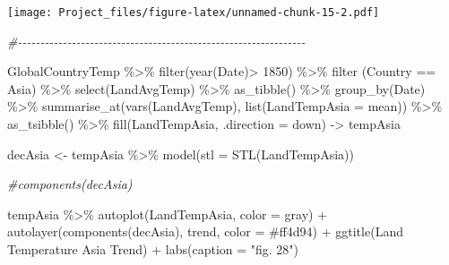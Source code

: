 \documentclass[
]{article}
\newenvironment{Shaded}{\begin{snugshade}}{\end{snugshade}}
\newcommand{\AttributeTok}[1]{\textcolor[rgb]{0.77,0.63,0.00}{#1}}
\newcommand{\CommentTok}[1]{\textcolor[rgb]{0.56,0.35,0.01}{\textit{#1}}}
\newcommand{\DecValTok}[1]{\textcolor[rgb]{0.00,0.00,0.81}{#1}}
\newcommand{\FunctionTok}[1]{\textcolor[rgb]{0.00,0.00,0.00}{#1}}
\newcommand{\NormalTok}[1]{#1}
\newcommand{\OtherTok}[1]{\textcolor[rgb]{0.56,0.35,0.01}{#1}}
\newcommand{\SpecialCharTok}[1]{\textcolor[rgb]{0.00,0.00,0.00}{#1}}
\newcommand{\StringTok}[1]{\textcolor[rgb]{0.31,0.60,0.02}{#1}}
\begin{document}
\texttt{[image: Project\_files/figure-latex/unnamed-chunk-15-2.pdf]}

\begin{Shaded}
\begin{Highlighting}[]
\CommentTok{\#{-}{-}{-}{-}{-}{-}{-}{-}{-}{-}{-}{-}{-}{-}{-}{-}{-}{-}{-}{-}{-}{-}{-}{-}{-}{-}{-}{-}{-}{-}{-}{-}{-}{-}{-}{-}{-}{-}{-}{-}{-}{-}{-}{-}{-}{-}{-}{-}{-}{-}{-}{-}{-}{-}{-}{-}{-}{-}{-}{-}{-}{-}{-}{-}}

\NormalTok{GlobalCountryTemp }\SpecialCharTok{\%\textgreater{}\%}
  \FunctionTok{filter}\NormalTok{(}\FunctionTok{year}\NormalTok{(Date)}\SpecialCharTok{\textgreater{}} \DecValTok{1850}\NormalTok{) }\SpecialCharTok{\%\textgreater{}\%}
  \FunctionTok{filter}\NormalTok{ (Country }\SpecialCharTok{==} \StringTok{\textquotesingle{}Asia\textquotesingle{}}\NormalTok{) }\SpecialCharTok{\%\textgreater{}\%}
  \FunctionTok{select}\NormalTok{(LandAvgTemp) }\SpecialCharTok{\%\textgreater{}\%}
  \FunctionTok{as\_tibble}\NormalTok{() }\SpecialCharTok{\%\textgreater{}\%}
  \FunctionTok{group\_by}\NormalTok{(Date) }\SpecialCharTok{\%\textgreater{}\%} 
  \FunctionTok{summarise\_at}\NormalTok{(}\FunctionTok{vars}\NormalTok{(LandAvgTemp), }\FunctionTok{list}\NormalTok{(}\AttributeTok{LandTempAsia =}\NormalTok{ mean)) }\SpecialCharTok{\%\textgreater{}\%}
  \FunctionTok{as\_tsibble}\NormalTok{() }\SpecialCharTok{\%\textgreater{}\%}
  \FunctionTok{fill}\NormalTok{(LandTempAsia, }\AttributeTok{.direction =} \StringTok{\textquotesingle{}down\textquotesingle{}}\NormalTok{) }\OtherTok{{-}\textgreater{}}\NormalTok{ tempAsia}

\NormalTok{decAsia }\OtherTok{\textless{}{-}}\NormalTok{ tempAsia }\SpecialCharTok{\%\textgreater{}\%} 
  \FunctionTok{model}\NormalTok{(}\AttributeTok{stl =} \FunctionTok{STL}\NormalTok{(LandTempAsia))}

\CommentTok{\#components(decAsia)}

\NormalTok{tempAsia }\SpecialCharTok{\%\textgreater{}\%}
  \FunctionTok{autoplot}\NormalTok{(LandTempAsia, }\AttributeTok{color =} \StringTok{\textquotesingle{}gray\textquotesingle{}}\NormalTok{) }\SpecialCharTok{+} 
  \FunctionTok{autolayer}\NormalTok{(}\FunctionTok{components}\NormalTok{(decAsia), trend, }\AttributeTok{color =} \StringTok{\textquotesingle{}\#ff4d94\textquotesingle{}}\NormalTok{) }\SpecialCharTok{+} 
  \FunctionTok{ggtitle}\NormalTok{(}\StringTok{\textquotesingle{}Land Temperature Asia Trend\textquotesingle{}}\NormalTok{) }\SpecialCharTok{+}
  \FunctionTok{labs}\NormalTok{(}\AttributeTok{caption =} \StringTok{"fig. 28"}\NormalTok{)}
\end{Highlighting}
\end{Shaded}
\end{document}
